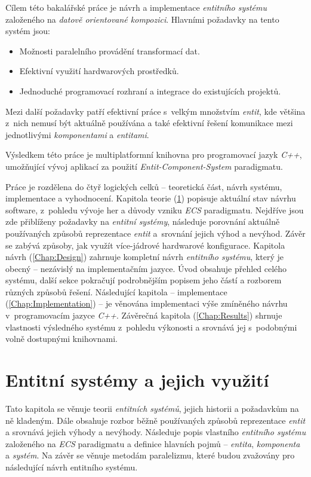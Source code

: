 Cílem této bakalářské práce je návrh a implementace \emph{entitního systému} založeného na \emph{datově orientované kompozici}. Hlavními požadavky na tento systém jsou: 
\begin{itemize}
	\item Možnosti paralelního provádění transformací dat.
	\item Efektivní využití hardwarových prostředků.
	\item Jednoduché programovací rozhraní a integrace do existujících projektů.
\end{itemize}
Mezi další požadavky patří efektivní práce s~velkým množstvím \emph{entit}, kde většina z~nich nemusí být aktuálně používána a také efektivní řešení komunikace mezi jednotlivými \emph{komponentami} a \emph{entitami}.

Výsledkem této práce je multiplatformní knihovna pro programovací jazyk \emph{C++}, umožňující vývoj aplikací za použití \emph{Entit-Component-System} paradigmatu. 

Práce je rozdělena do čtyř logických celků -- teoretická část, návrh systému, implementace a vyhodnocení. Kapitola teorie (\ref{Chap:Theory}) popisuje aktuální stav návrhu software, z~pohledu vývoje her a důvody vzniku \emph{ECS} paradigmatu. Nejdříve jsou zde přiblíženy požadavky na \emph{entitní systémy}, následuje porovnání aktuálně používaných způsobů reprezentace \emph{entit} a~srovnání jejich výhod a nevýhod. Závěr se zabývá způsoby, jak využít více-jádrové hardwarové konfigurace. Kapitola návrh (\ref{Chap:Design}) zahrnuje kompletní návrh \emph{entitního systému}, který je obecný -- nezávislý na implementačním jazyce. Úvod obsahuje přehled celého systému, další sekce pokračují podrobnějším popisem jeho částí a rozborem různých způsobů řešení. Následující kapitola -- implementace (\ref{Chap:Implementation}) -- je věnována implementaci výše zmíněného návrhu v~programovacím jazyce \emph{C++}. Závěrečná kapitola (\ref{Chap:Results}) shrnuje vlastnosti výsledného systému z~pohledu výkonosti a srovnává jej s~podobnými volně dostupnými knihovnami.

\chapter{Entitní systémy a jejich využití}
\label{Chap:Theory}

Tato kapitola se věnuje teorii \emph{entitních systémů}, jejich historii a požadavkům na ně kladeným. Dále obsahuje rozbor běžně používaných způsobů reprezentace \emph{entit} a srovnává jejich výhody a nevýhody. Následuje popis vlastního \emph{entitního systému} založeného na \emph{ECS} paradigmatu a definice hlavních pojmů -- \emph{entita}, \emph{komponenta} a \emph{systém}. Na závěr se věnuje metodám paralelizmu, které budou zvažovány pro následující návrh entitního systému.

